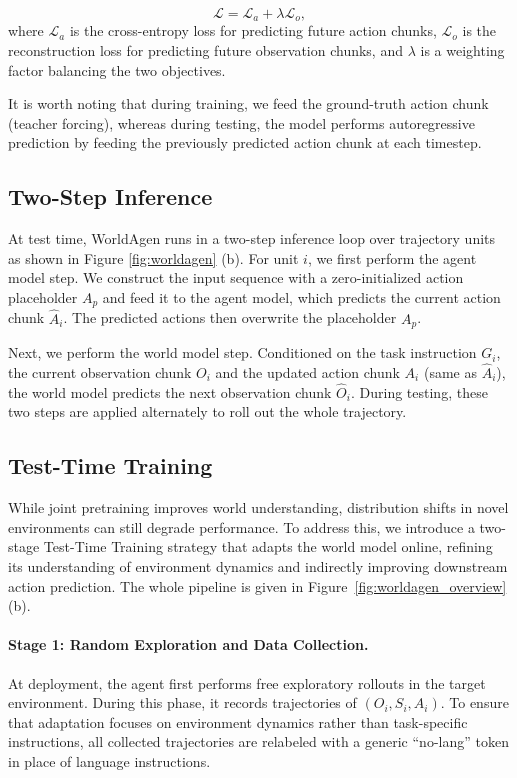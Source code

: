 \[
\mathcal{L} = \mathcal{L}_a + \lambda \mathcal{L}_o,
\]
where $\mathcal{L}_a$ is the cross-entropy loss for predicting future action chunks, $\mathcal{L}_o$ is the reconstruction loss for predicting future observation chunks, and $\lambda$ is a weighting factor balancing the two objectives.

It is worth noting that during training, we feed the ground-truth action chunk (teacher forcing), whereas during testing, the model performs autoregressive prediction by feeding the previously predicted action chunk at each timestep.

\subsection{Two-Step Inference}

At test time, WorldAgen runs in a two-step inference loop over trajectory units as shown in Figure \ref{fig:worldagen} (b). For unit $i$, we first perform the agent model step. We construct
the input sequence with a zero-initialized action placeholder $A_p$ and feed it to the agent model, which predicts the current action chunk $\hat{A}_i$. The predicted actions then overwrite the placeholder $A_p$.

Next, we perform the world model step. Conditioned on the task instruction $G_i$, the current observation chunk
$O_i$ and the updated action chunk $A_i$ (same as $\hat{A}_i$), the world model predicts the next observation chunk $\hat{O}_i$. During testing, these two steps are applied alternately to roll out the whole trajectory.

\subsection{Test-Time Training}
While joint pretraining improves world understanding, distribution shifts in novel environments can still degrade performance.
To address this, we introduce a two-stage Test-Time Training strategy that adapts the world model online, refining its understanding of environment dynamics and indirectly improving downstream action prediction. The whole pipeline is given in Figure~\ref{fig:worldagen_overview} (b).

\paragraph{Stage 1: Random Exploration and Data Collection.}
At deployment, the agent first performs free exploratory rollouts in the target environment.
During this phase, it records trajectories of $(O_i, S_i, A_i)$.
To ensure that adaptation focuses on environment dynamics rather than task-specific instructions, all collected trajectories are relabeled with a generic ``no-lang'' token in place of language instructions.

